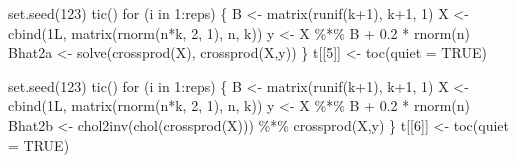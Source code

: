 \documentclass[
  letterpaper,
]{book}
\newenvironment{Shaded}{\begin{snugshade}}{\end{snugshade}}
\newcommand{\AttributeTok}[1]{\textcolor[rgb]{0.40,0.45,0.13}{#1}}
\newcommand{\ConstantTok}[1]{\textcolor[rgb]{0.56,0.35,0.01}{#1}}
\newcommand{\ControlFlowTok}[1]{\textcolor[rgb]{0.00,0.23,0.31}{#1}}
\newcommand{\DecValTok}[1]{\textcolor[rgb]{0.68,0.00,0.00}{#1}}
\newcommand{\FloatTok}[1]{\textcolor[rgb]{0.68,0.00,0.00}{#1}}
\newcommand{\FunctionTok}[1]{\textcolor[rgb]{0.28,0.35,0.67}{#1}}
\newcommand{\NormalTok}[1]{\textcolor[rgb]{0.00,0.23,0.31}{#1}}
\newcommand{\OtherTok}[1]{\textcolor[rgb]{0.00,0.23,0.31}{#1}}
\newcommand{\SpecialCharTok}[1]{\textcolor[rgb]{0.37,0.37,0.37}{#1}}
\begin{document}
\begin{Shaded}
\begin{Highlighting}[]
\FunctionTok{set.seed}\NormalTok{(}\DecValTok{123}\NormalTok{)}
\FunctionTok{tic}\NormalTok{()}
\ControlFlowTok{for}\NormalTok{ (i }\ControlFlowTok{in} \DecValTok{1}\SpecialCharTok{:}\NormalTok{reps) \{ }
\NormalTok{  B }\OtherTok{\textless{}{-}} \FunctionTok{matrix}\NormalTok{(}\FunctionTok{runif}\NormalTok{(k}\SpecialCharTok{+}\DecValTok{1}\NormalTok{), k}\SpecialCharTok{+}\DecValTok{1}\NormalTok{, }\DecValTok{1}\NormalTok{)}
\NormalTok{  X }\OtherTok{\textless{}{-}} \FunctionTok{cbind}\NormalTok{(1L, }\FunctionTok{matrix}\NormalTok{(}\FunctionTok{rnorm}\NormalTok{(n}\SpecialCharTok{*}\NormalTok{k, }\DecValTok{2}\NormalTok{, }\DecValTok{1}\NormalTok{), n, k))}
\NormalTok{  y }\OtherTok{\textless{}{-}}\NormalTok{ X }\SpecialCharTok{\%*\%}\NormalTok{ B }\SpecialCharTok{+} \FloatTok{0.2} \SpecialCharTok{*} \FunctionTok{rnorm}\NormalTok{(n) }
\NormalTok{  Bhat2a }\OtherTok{\textless{}{-}} \FunctionTok{solve}\NormalTok{(}\FunctionTok{crossprod}\NormalTok{(X), }\FunctionTok{crossprod}\NormalTok{(X,y)) }
\NormalTok{  \}}
\NormalTok{t[[}\DecValTok{5}\NormalTok{]] }\OtherTok{\textless{}{-}} \FunctionTok{toc}\NormalTok{(}\AttributeTok{quiet =} \ConstantTok{TRUE}\NormalTok{)}

\FunctionTok{set.seed}\NormalTok{(}\DecValTok{123}\NormalTok{)}
\FunctionTok{tic}\NormalTok{()}
\ControlFlowTok{for}\NormalTok{ (i }\ControlFlowTok{in} \DecValTok{1}\SpecialCharTok{:}\NormalTok{reps) \{ }
\NormalTok{  B }\OtherTok{\textless{}{-}} \FunctionTok{matrix}\NormalTok{(}\FunctionTok{runif}\NormalTok{(k}\SpecialCharTok{+}\DecValTok{1}\NormalTok{), k}\SpecialCharTok{+}\DecValTok{1}\NormalTok{, }\DecValTok{1}\NormalTok{)}
\NormalTok{  X }\OtherTok{\textless{}{-}} \FunctionTok{cbind}\NormalTok{(1L, }\FunctionTok{matrix}\NormalTok{(}\FunctionTok{rnorm}\NormalTok{(n}\SpecialCharTok{*}\NormalTok{k, }\DecValTok{2}\NormalTok{, }\DecValTok{1}\NormalTok{), n, k))}
\NormalTok{  y }\OtherTok{\textless{}{-}}\NormalTok{ X }\SpecialCharTok{\%*\%}\NormalTok{ B }\SpecialCharTok{+} \FloatTok{0.2} \SpecialCharTok{*} \FunctionTok{rnorm}\NormalTok{(n)}
\NormalTok{  Bhat2b }\OtherTok{\textless{}{-}} \FunctionTok{chol2inv}\NormalTok{(}\FunctionTok{chol}\NormalTok{(}\FunctionTok{crossprod}\NormalTok{(X))) }\SpecialCharTok{\%*\%} \FunctionTok{crossprod}\NormalTok{(X,y) }
\NormalTok{  \}}
\NormalTok{t[[}\DecValTok{6}\NormalTok{]] }\OtherTok{\textless{}{-}} \FunctionTok{toc}\NormalTok{(}\AttributeTok{quiet =} \ConstantTok{TRUE}\NormalTok{)}


\end{Highlighting}
\end{Shaded}
\end{document}
